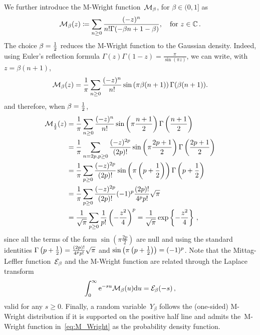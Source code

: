 We further introduce the $\mathrm{M}$-Wright function~$\mathcal{M}_{\beta}$, for $\beta\in(0, 1]$ as
\begin{equation}\label{eq:M_Wright}
\mathcal{M}_{\beta}(z) \coloneqq 
\sum_{n\geq 0} \frac{(-z)^n}{n ! \Gamma(-\beta n+1-\beta)}, \quad\text{for }z \in \mathbb{C}\,.
\end{equation}
The choice $\beta=\frac{1}{2}$ reduces the M-Wright function to the Gaussian density.
Indeed, using Euler's reflection formula
$\Gamma(z)\Gamma(1-z) = \frac{\pi}{\sin(\pi z)}$, we can write, with~${z=\beta(n+1)}$,
$$
\mathcal{M}_{\beta}(z)
 = \frac{1}{\pi}\sum_{n\geq 0} \frac{(-z)^n}{n!}
\sin\left(\pi\beta(n+1)\right)\Gamma(\beta(n+1)).
$$
and therefore, when $\beta=\frac{1}{2}$,
\begin{align*}
\mathcal{M}_{\frac{1}{2}}(z)
 & = \frac{1}{\pi}\sum_{n\geq 0} \frac{(-z)^n}{n!}
\sin\left(\pi\frac{n+1}{2}\right)\Gamma\left(\frac{n+1}{2}\right)\\
 & = \frac{1}{\pi}\sum_{n=2p, p\geq 0} \frac{(-z)^{2p}}{(2p)!}
\sin\left(\pi\frac{2p+1}{2}\right)\Gamma\left(\frac{2p+1}{2}\right)\\
 & = \frac{1}{\pi}\sum_{p\geq 0} \frac{(-z)^{2p}}{(2p)!}
\sin\left(\pi\left(p+\frac{1}{2}\right)\right)\Gamma\left(p+\frac{1}{2}\right)\\
 & = \frac{1}{\pi}\sum_{p\geq 0} \frac{(-z)^{2p}}{(2p)!}
(-1)^{p}\frac{(2p)!}{4^p p!}\sqrt{\pi}\\
 & = \frac{1}{\sqrt{\pi}}\sum_{p\geq 0} 
 \frac{1}{p!}\left(-\frac{z^2}{4}\right)^{p}
  = \frac{1}{\sqrt{\pi}}\exp\left\{-\frac{z^2}{4}\right\}\,,
\end{align*}
since all the terms of the form $\sin\left(\pi\frac{2p}{2}\right)$ are null and using 
the standard identities $\Gamma\left(p+\frac{1}{2}\right) = \frac{(2p)!}{4^p p!}\sqrt{\pi}$ and $\sin\left(\pi\left(p+\frac{1}{2}\right)\right) = (-1)^{p}$.
Note that the Mittag-Leffler function~$\mathcal{E}_{\beta}$ and the M-Wright function are related through the Laplace transform
\begin{equation}\label{eq:LaplaceM-Wright}
\int_0^{\infty} \mathrm{e}^{-s u} \mathcal{M}_{\beta}(u) \mathrm{d} u
= \mathcal{E}_{\beta}(-s)\,,
\end{equation}
valid for any $s\geq 0$.
Finally, a random variable~$Y_\beta$ follows the (one-sided) $\mathrm{M}$-Wright distribution
if it is supported on the positive half line
and admits 
the~M-Wright function in~\eqref{eq:M_Wright}
as the probability density function.
